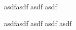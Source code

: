 \documentclass[12pt, twoside]{report} %
\begin{document}
asdfasdf asdf asdf  

\pagebreak 

asdfasdf asdf asdf asdf 
\end{document}
